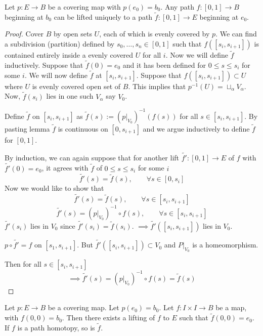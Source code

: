\documentclass[12pt]{amsart}
\begin{document}
\begin{lemma}
    Let $p: E\to B$ be a covering map with $p(e_0) = b_0$. Any path $f:[0,1] \to B$ beginning at $b_0$ can be lifted uniquely to a path $\widetilde{f}: [0,1] \to E$ beginning at $e_0$.
\end{lemma}

\begin{proof}
    Cover $B$ by open sets $U$, each of which is evenly covered by $p$. We can find a subdivision (partition) defined by $s_0, \ldots, s_n \in [0,1]$ such that $f([s_i, s_{i+1}])$ is contained entirely inside a evenly covered $U$ for all $i$. Now we will define $\widetilde{f}$ inductively. Suppose that $\widetilde{f}(0) = e_0$ and it has been defined for $0 \leq s \leq s_i$ for some $i$. We will now define $\widetilde{f}$ at $[s_i, s_{i+1}]$. Suppose that $f([s_i, s_{i+1}]) \subset U$ where $U$ is evenly covered open set of $B$. This implies that $p^{-1}(U) = \sqcup_\alpha V_\alpha$. Now, $\widetilde{f}(s_i)$ lies in one such $V_\alpha$ say $V_0$. 

    Define $\widetilde{f}$ on $[s_i, s_{i+1}]$ as $\widetilde{f}(s) := (p |_{V_0})^{-1}(f(s))$ for all $s \in [s_i, s_{i+1}]$. 
    By pasting lemma $\widetilde{f}$ is continuous on $[0,s_{i+1}]$ and we argue inductively to define $\widetilde{f}$ for $[0,1]$. 
    
    By induction, we can again suppose that for another lift $\widetilde{f'}: [0,1] \to E$ of $f$ with $\widetilde{f'}(0) = e_0$, it agrees with $\widetilde{f}$ of $0 \leq s \leq s_i$ for some $i$ \[\widetilde{f'}(s) = \widetilde{f}(s), \qquad \forall s \in [0, s_i]\]
    Now we would like to show that 
    \[\widetilde{f'} (s) = \widetilde{f} (s), \qquad \forall s \in [s_i, s_{i+1}] \]
    \[\widetilde{f'} (s) =  (p|_{V_0})^{-1} \circ f (s), \qquad \forall s \in [s_i, s_{i+1}] \]
    $\widetilde{f'}(s_i)$ lies in $V_0$ since $\widetilde{f'}(s_i) = \widetilde{f}(s_i)$. 
    $\implies \widetilde{f'}([s_i, s_{i+1}])$ lies in $V_0$. 
    
    $p \circ \widetilde{f'} = f$ on $[s_1, s_{i+1}]$. But $\widetilde{f'}([s_i, s_{i+1}]) \subset V_0$ and $P|_{V_0}$ is a homeomorphism. 

    Then for all $s \in [s_i, s_{i+1}]$
    \[\implies \widetilde{f'}(s) = (p|_{V_0})^{-1} \circ f (s) = \widetilde{f}(s)\]
\end{proof}

\begin{lemma}
    Let $p: E \to B$ be a covering map. Let $p(e_0) = b_0$. Let $f: I \times I \to B$ be a map, with $f(0,0) = b_0$. Then there exists a lifting of $f$ to $E$ such that $\widetilde{f}(0,0) = e_0$. If $f$ is a path homotopy, so is $\widetilde{f}$. 
\end{lemma}
\end{document}

